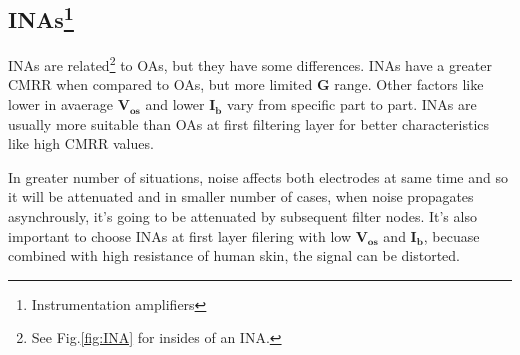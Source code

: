 \documentclass[a4paper, 10pt]{article} %
\newcommand{\mathbff}[1]{$\boldsymbol{#1}$}
\newcommand{\parenciteit}[2]{\textit{\parencite[#1]{#2}}} %
\begin{document}
    \subsection*{INAs\footnote{Instrumentation amplifiers}}
    \hspace{\parindent}INAs are related\footnote{See Fig.\ref{fig:INA} for insides of an INA.} to OAs, but they have some differences. INAs have a greater CMRR when compared to OAs, but more limited \mathbff{G} range. Other factors like lower in avaerage \mathbff{V_{os}} and lower \mathbff{I_{b}} vary from specific part to part. INAs are usually more suitable than OAs at first filtering layer \parenciteit{}{Naik} for better characteristics like high CMRR values.

    \noindent In greater number of situations, noise affects both electrodes at same time and so it will be attenuated and in smaller number of cases, when noise propagates asynchrously, it's going to be attenuated by subsequent filter nodes. It's also important to choose INAs at first layer filering with low \mathbff{V_{os}} and \mathbff{I_{b}}, becuase combined with high resistance of human skin, the signal can be distorted.
\end{document}
